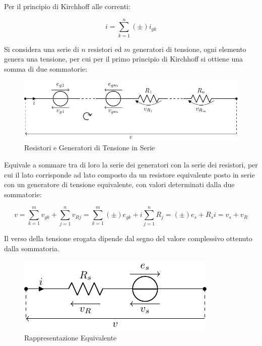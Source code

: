 \documentclass{article}
\numberwithin{equation}{subsection}
\begin{document}
Per il principio di Kirchhoff alle correnti:

\begin{equation*}
    i=\displaystyle\sum_{k=1}^n(\pm)i_{gk}
\end{equation*}


Si considera una serie di $n$ resistori ed $m$ generatori di tensione, ogni elemento genera una tensione, per cui per il primo principio di Kirchhoff si ottiene una somma 
di due sommatorie: 

\begin{figure}[H]%
    \centering
    \includegraphics{generatore-tensione-resistori-serie.pdf}
    \caption{Resistori e Generatori di Tensione in Serie}
    \label{fig:generatore-tensione-resistori-serie}
\end{figure}


Equivale a sommare tra di loro la serie dei generatori con la serie dei resistori, per cui il lato corrisponde ad lato composto da un resistore equivalente posto in serie 
con un generatore di tensione equivalente, con valori determinati dalla due sommatorie:

\begin{equation*}
    v=\displaystyle\sum_{k=1}^mv_{gk}+\sum_{j=1}^nv_{Rj}=\sum_{k=1}^m(\pm)e_{gk}+i\sum_{j=1}^nR_j=(\pm)e_{s}+R_si=v_{s}+v_R
\end{equation*}

Il verso della tensione erogata dipende dal segno del valore complessivo ottenuto dalla sommatoria. 

\begin{figure}[H]%
    \centering
    \includegraphics{generatore-tensione-resistori-serie-equivalente.pdf}%
    \caption{Rappresentazione Equivalente}
    \label{fig:generatore-tensione-resistori-serie-equivalente}
\end{figure}
\end{document}
